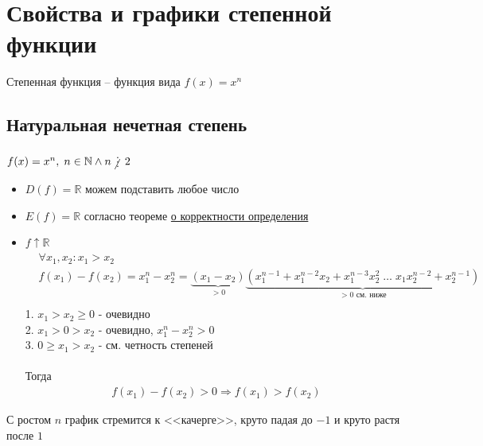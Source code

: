 \section{Свойства и графики степенной функции}

\begin{definition}
    Степенная функция -- функция вида $f(x) = x^n$
\end{definition}

\subsection{Натуральная нечетная степень}

$f(x) = x^n, \; n \in \mathbb{N}  \land n \notdivisible 2$

\begin{itemize}
    \item $D(f) = \mathbb{R}$
    можем подставить любое число
    \item $E(f) = \mathbb{R}$
    согласно теореме \hyperref[thm:1.2.3]{о корректности определения}
    \item $f \uparrow \mathbb{R}$\\
    \begin{align*}
        &\forall x_1, x_2 : x_1 > x_2 \\
        &f(x_1) - f(x_2) = x_1^n - x_2^n = \underbrace{(x_1 - x_2)}_{> 0} \underbrace{(x_1^{n-1} + x_1^{n-2}x_2 + x_1^{n-3}x_2^2 \; \dots \; x_1x_2^{n-2} + x_2^{n-1})}_{> 0 \text{ см. ниже}} \\
    \end{align*}
    1. $x_1 > x_2 \ge 0$ - очевидно \\
    2. $x_1 > 0 > x_2$ - очевидно, $x_1^n - x_2^n > 0$ \\
    3. $0 \ge x_1 > x_2$ - см. четность степеней \\ \\
    Тогда
    \begin{align*}
        f(x_1) - f(x_2) > 0 \Rightarrow f(x_1) > f(x_2)
    \end{align*}
\end{itemize}

\begin{remark}
    С ростом $n$ график стремится к <<качерге>>, круто падая до $-1$ и круто растя после $1$
\end{remark}

\newpage

